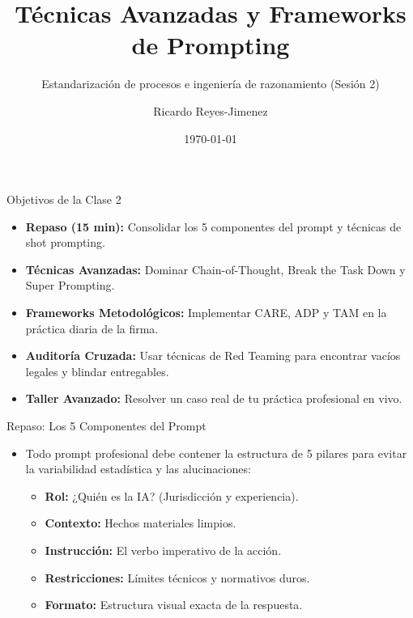 \documentclass[aspectratio=169]{beamer}
\title[ Técnicas Avanzadas y Framewor]{ Técnicas Avanzadas y Frameworks de Prompting}
\subtitle{ Estandarización de procesos e ingeniería de razonamiento (Sesión 2)}
\author{Ricardo Reyes-Jimenez}
\institute{Universidad de La Sabana}
\date{\today}
\begin{document}
\begin{frame}
  \titlepage
\end{frame}

\usebackgroundtemplate{}



\begin{frame}[fragile]{Objetivos de la Clase 2}


\begin{itemize}
  \item \textbf{Repaso (15 min):} Consolidar los 5 componentes del prompt y técnicas de shot prompting.
  \item \textbf{Técnicas Avanzadas:} Dominar Chain-of-Thought, Break the Task Down y Super Prompting.
  \item \textbf{Frameworks Metodológicos:} Implementar CARE, ADP y TAM en la práctica diaria de la firma.
  \item \textbf{Auditoría Cruzada:} Usar técnicas de Red Teaming para encontrar vacíos legales y blindar entregables.
  \item \textbf{Taller Avanzado:} Resolver un caso real de tu práctica profesional en vivo.
\end{itemize}
\end{frame}



\begin{frame}[fragile]{Repaso: Los 5 Componentes del Prompt}


\begin{itemize}
  \item Todo prompt profesional debe contener la estructura de 5 pilares para evitar la variabilidad estadística y las alucinaciones:
  \begin{itemize}
    \item \textbf{Rol:} ¿Quién es la IA? (Jurisdicción y experiencia).
    \item \textbf{Contexto:} Hechos materiales limpios.
    \item \textbf{Instrucción:} El verbo imperativo de la acción.
    \item \textbf{Restricciones:} Límites técnicos y normativos duros.
    \item \textbf{Formato:} Estructura visual exacta de la respuesta.
  \end{itemize}
\end{itemize}
\end{frame}
\end{document}
